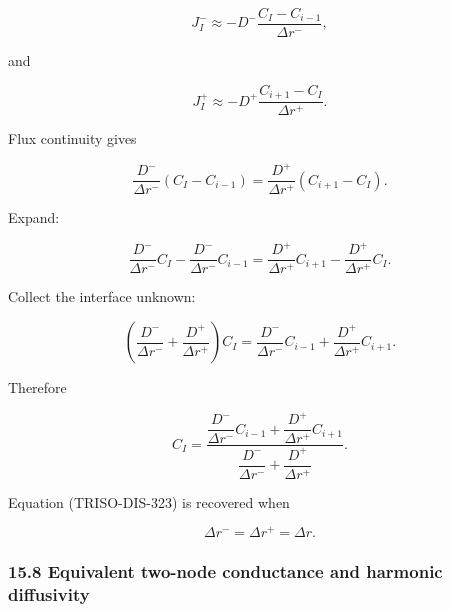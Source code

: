 \documentclass[11pt,a4paper]{article}
\begin{document}
\begin{equation}
J_I^-
\approx
-D^-
\frac{
C_I-C_{i-1}
}{
\Delta r^-
},
\tag{TRISO-DIS-326}
\label{eq:triso-dis-326}
\end{equation}

and

\begin{equation}
J_I^+
\approx
-D^+
\frac{
C_{i+1}-C_I
}{
\Delta r^+
}.
\tag{TRISO-DIS-327}
\label{eq:triso-dis-327}
\end{equation}

Flux continuity gives

\begin{equation}
\frac{D^-}{\Delta r^-}
(C_I-C_{i-1})
=
\frac{D^+}{\Delta r^+}
(C_{i+1}-C_I).
\tag{TRISO-DIS-328}
\label{eq:triso-dis-328}
\end{equation}

Expand:

\begin{equation}
\frac{D^-}{\Delta r^-}C_I
-
\frac{D^-}{\Delta r^-}C_{i-1}
=
\frac{D^+}{\Delta r^+}C_{i+1}
-
\frac{D^+}{\Delta r^+}C_I.
\tag{TRISO-DIS-329}
\label{eq:triso-dis-329}
\end{equation}

Collect the interface unknown:

\begin{equation}
\left(
\frac{D^-}{\Delta r^-}
+
\frac{D^+}{\Delta r^+}
\right)
C_I
=
\frac{D^-}{\Delta r^-}C_{i-1}
+
\frac{D^+}{\Delta r^+}C_{i+1}.
\tag{TRISO-DIS-330}
\label{eq:triso-dis-330}
\end{equation}

Therefore

\begin{equation}
\boxed{
C_I
=
\frac{
\dfrac{D^-}{\Delta r^-}C_{i-1}
+
\dfrac{D^+}{\Delta r^+}C_{i+1}
}{
\dfrac{D^-}{\Delta r^-}
+
\dfrac{D^+}{\Delta r^+}
}.
}
\tag{TRISO-DIS-331}
\label{eq:triso-dis-331}
\end{equation}

Equation (TRISO-DIS-323) is recovered when

\begin{equation}
\Delta r^-=\Delta r^+=\Delta r.
\tag{TRISO-DIS-332}
\label{eq:triso-dis-332}
\end{equation}

\subsubsection*{15.8 Equivalent two-node conductance and harmonic diffusivity}
\end{document}
